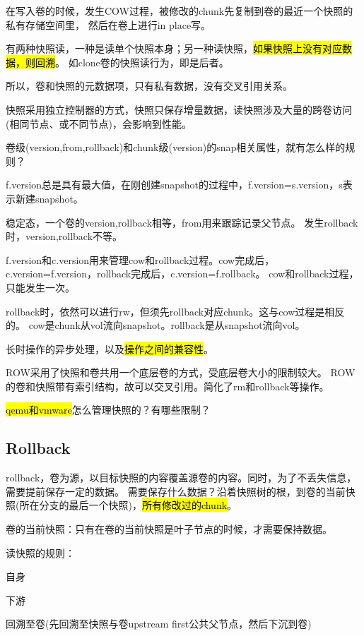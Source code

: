 在写入卷的时候，发生COW过程，被修改的chunk先复制到卷的最近一个快照的私有存储空间里，
然后在卷上进行in place写。

有两种快照读，一种是读单个快照本身；另一种读快照，\hl{如果快照上没有对应数据，则回溯}。
如clone卷的快照读行为，即是后者。

所以，卷和快照的元数据项，只有私有数据，没有交叉引用关系。

快照采用独立控制器的方式，快照只保存增量数据，读快照涉及大量的跨卷访问(相同节点、或不同节点)，会影响到性能。

\hrulefill

卷级(version,from,rollback)和chunk级(version)的snap相关属性，就有怎么样的规则？

f.version总是具有最大值，在刚创建snapshot的过程中，f.version=s.version，s表示新建snapshot。

稳定态，一个卷的version,rollback相等，from用来跟踪记录父节点。
发生rollback时，version,rollback不等。

f.version和c.version用来管理cow和rollback过程。cow完成后，c.version=f.version，rollback完成后，c.version=f.rollback。
cow和rollback过程，只能发生一次。

rollback时，依然可以进行rw，但须先rollback对应chunk。这与cow过程是相反的。
cow是chunk从vol流向snapshot。rollback是从snapshot流向vol。

\hrulefill

长时操作的异步处理，以及\hl{操作之间的兼容性}。

ROW采用了快照和卷共用一个底层卷的方式，受底层卷大小的限制较大。
ROW的卷和快照带有索引结构，故可以交叉引用。简化了rm和rollback等操作。

\hl{qemu和vmware}怎么管理快照的？有哪些限制？

\subsection{Rollback}

rollback，卷为源，以目标快照的内容覆盖源卷的内容。同时，为了不丢失信息，需要提前保存一定的数据。
需要保存什么数据？沿着快照树的根，到卷的当前快照(所在分支的最后一个快照)，\hl{所有修改过的chunk}。

卷的当前快照：只有在卷的当前快照是叶子节点的时候，才需要保持数据。

读快照的规则：
\begin{compactenum}
\item 自身
\item 下游
\item 回溯至卷(先回溯至快照与卷upstream first公共父节点，然后下沉到卷)
\end{compactenum}

